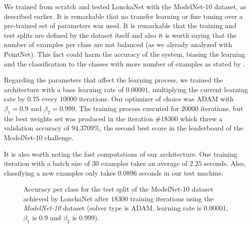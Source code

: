 We trained from scratch and tested LonchaNet with the ModelNet-10 dataset, as described earlier. It is remarkable that no transfer learning or fine tuning over a pre-trained set of parameters was used. It is remarkable that the training and test splits are defined by the dataset itself and also it is worth saying that the number of examples per class are not balanced (as we already analyzed with PointNet). This fact could harm the accuracy of the system, biasing the learning and the classification to the classes with more number of examples as stated by \cite{He2009}.

Regarding the parameters that affect the learning process, we trained the architecture with a base learning rate of $0.00001$, multiplying the current learning rate by $0.75$ every $10000$ iterations. Our optimizer of choice was ADAM \cite{KingmaB14} with $\beta_1=0.9$ and $\beta_2=0.999$. The training process executed for $20000$ iterations, but the best weights set was produced in the iteration $\#18300$ which threw a validation accuracy of $94.3709$\%, the second best score in the leaderboard of the ModelNet-10 challenge.

It is also worth noting the fast computations of our architecture. One training iteration with a batch size of $30$ examples takes an average of $2.25$ seconds. Also, classifying a new examples only takes $0.0896$ seconds in our test machine.

\begin{figure}[!htb]
	\centering
	\caption{Accuracy per class for the test split of the ModelNet-10 dataset achieved by LonchaNet after $18300$ training iterations using the \emph{ModelNet-10} dataset (solver type is ADAM, learning rate is 0.00001, $\beta_1$ is 0.9 and $\beta_2$ is 0.999).}
	\label{fig:success_per_class}
\end{figure}


